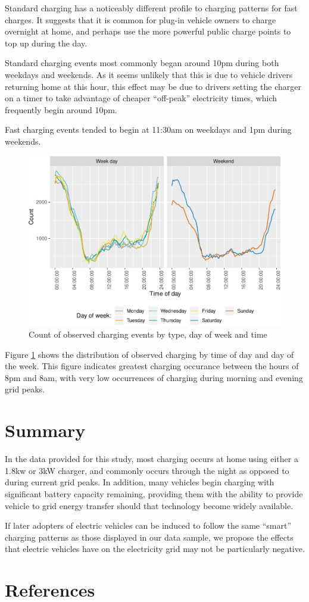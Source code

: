 \documentclass[]{article}
\begin{document}
Standard charging has a noticeably different profile to charging
patterns for fast charges. It suggests that it is common for plug-in
vehicle owners to charge overnight at home, and perhaps use the more
powerful public charge points to top up during the day.

Standard charging events most commonly began around 10pm during both
weekdays and weekends. As it seems unlikely that this is due to vehicle
drivers returning home at this hour, this effect may be due to drivers
setting the charger on a timer to take advantage of cheaper ``off-peak''
electricity times, which frequently begin around 10pm.

Fast charging events tended to begin at 11:30am on weekdays and 1pm
during weekends.

\begin{figure}
\centering
\includegraphics{EVBB_report_files/figure-latex/chargeTime-1.pdf}
\caption{\label{fig:chargeTime}Count of observed charging events by type,
day of week and time}
\end{figure}

Figure \ref{fig:chargeTime} shows the distribution of observed charging
by time of day and day of the week. This figure indicates greatest
charging occurance between the hours of 8pm and 8am, with very low
occurrences of charging during morning and evening grid peaks.

\section{Summary}\label{summary}

In the data provided for this study, most charging occurs at home using
either a 1.8kw or 3kW charger, and commonly occurs through the night as
opposed to during current grid peaks. In addition, many vehicles begin
charging with significant battery capacity remaining, providing them
with the ability to provide vehicle to grid energy transfer should that
technology become widely available.

If later adopters of electric vehicles can be induced to follow the same
``smart'' charging patterns as those displayed in our data sample, we
propose the effects that electric vehicles have on the electricity grid
may not be particularly negative.

\section{References}\label{references}
\end{document}
